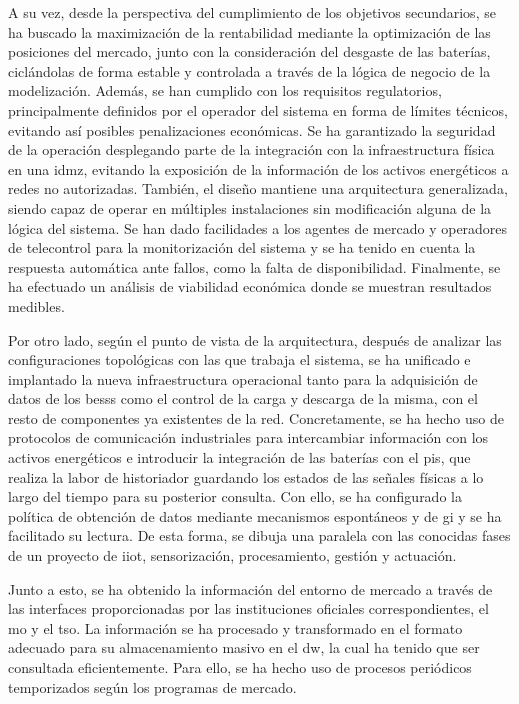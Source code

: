 A su vez, desde la perspectiva del cumplimiento de los objetivos secundarios, se ha buscado la maximización de la rentabilidad mediante la optimización de las posiciones del mercado, junto con la consideración del desgaste de las baterías, ciclándolas de forma estable y controlada a través de la lógica de negocio de la modelización. Además, se han cumplido con los requisitos regulatorios, principalmente definidos por el operador del sistema en forma de límites técnicos, evitando así posibles penalizaciones económicas. Se ha garantizado la seguridad de la operación desplegando parte de la integración con la infraestructura física en una \gls{idmz}, evitando la exposición de la información de los activos energéticos a redes no autorizadas. También, el diseño mantiene una arquitectura generalizada, siendo capaz de operar en múltiples instalaciones sin modificación alguna de la lógica del sistema. Se han dado facilidades a los agentes de mercado y operadores de telecontrol para la monitorización del sistema y se ha tenido en cuenta la respuesta automática ante fallos, como la falta de disponibilidad. Finalmente, se ha efectuado un análisis de viabilidad económica donde se muestran resultados medibles.

Por otro lado, según el punto de vista de la arquitectura, después de analizar las configuraciones topológicas con las que trabaja el sistema, se ha unificado e implantado la nueva infraestructura operacional tanto para la adquisición de datos de los \glspl{bess} como el control de la carga y descarga de la misma, con el resto de componentes ya existentes de la red. Concretamente, se ha hecho uso de protocolos de comunicación industriales para intercambiar información con los activos energéticos e introducir la integración de las baterías con el \gls{pis}, que realiza la labor de historiador guardando los estados de las señales físicas a lo largo del tiempo para su posterior consulta. Con ello, se ha configurado la política de obtención de datos mediante mecanismos espontáneos y de \gls{gi} y se ha facilitado su lectura. De esta forma, se dibuja una paralela con las conocidas fases de un proyecto de \gls{iiot}, sensorización, procesamiento, gestión y actuación.

Junto a esto, se ha obtenido la información del entorno de mercado a través de las interfaces proporcionadas por las instituciones oficiales correspondientes, el \gls{mo} y el \gls{tso}. La información se ha procesado y transformado en el formato adecuado para su almacenamiento masivo en el \gls{dw}, la cual ha tenido que ser consultada eficientemente. Para ello, se ha hecho uso de procesos periódicos temporizados según los programas de mercado.

